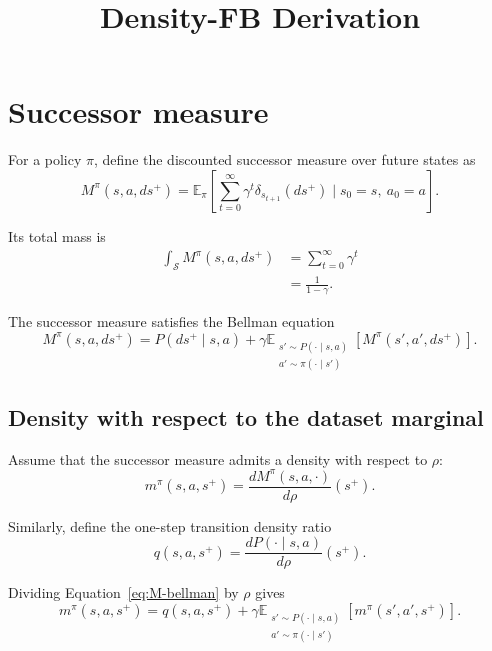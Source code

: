 \documentclass[11pt]{article}
\title{Density-FB Derivation}
\date{}
\begin{document}
\maketitle

\section{Successor measure}

For a policy $\pi$, define the discounted successor measure over future states as
\begin{equation}
    M^\pi(s,a,ds^+) = \mathbb E_\pi \left[ \sum_{t=0}^{\infty} \gamma^t \delta_{s_{t+1}}(ds^+) \mid s_0=s,\ a_0=a \right].
    \label{eq:M-definition}
\end{equation}

Its total mass is
\begin{align}
    \int_{\mathcal S} M^\pi(s,a,ds^+)   &=  \sum_{t=0}^{\infty}\gamma^t \\
                                        &=  \frac{1}{1-\gamma}.
    \label{eq:M-mass}
\end{align}

The successor measure satisfies the Bellman equation
\begin{equation}
    M^\pi(s,a,ds^+) = P(ds^+\mid s,a) + \gamma \mathbb E_{\substack{ s'\sim P(\cdot\mid s,a)\\  a'\sim\pi(\cdot\mid s') }}  \left[  M^\pi(s',a',ds^+)   \right].
    \label{eq:M-bellman}
\end{equation}

\subsection{Density with respect to the dataset marginal}

Assume that the successor measure admits a density with respect to $\rho$:
\begin{equation}
m^\pi(s,a,s^+) = \frac{dM^\pi(s,a,\cdot)}{d\rho}(s^+).
\label{eq:m-definition}
\end{equation}

Similarly, define the one-step transition density ratio
\begin{equation}
q(s,a,s^+) = \frac{dP(\cdot\mid s,a)}{d\rho}(s^+). 
\label{eq:q-definition}
\end{equation}

Dividing Equation~\eqref{eq:M-bellman} by $\rho$ gives
\begin{equation}
m^\pi(s,a,s^+) = q(s,a,s^+) + \gamma \mathbb E_{\substack{ s'\sim P(\cdot\mid s,a)\\ a'\sim\pi(\cdot\mid s') }} \left[ m^\pi(s',a',s^+) \right].
\label{eq:m-bellman}
\end{equation}
\end{document}
